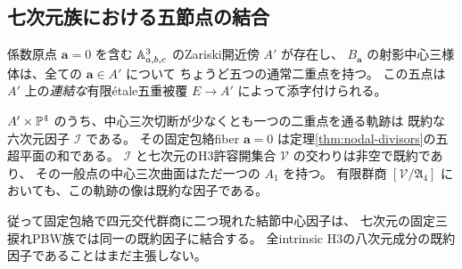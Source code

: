 \subsection{七次元族における五節点の結合}
\begin{theorem}[既約な六次元の結節中心軌跡]
\label{thm:seven-nodal-irreducible}
係数原点 $\mathbf a=0$ を含む $\AA^3_{a,b,c}$ のZariski開近傍 $A'$ が存在し、
$B_{\mathbf a}$ の射影中心三様体は、全ての $\mathbf a\in A'$ について
ちょうど五つの通常二重点を持つ。
この五点は $A'$ 上の\emph{連結な}有限\'{e}tale五重被覆
$E\to A'$ によって添字付けられる。

$A'\times\PP^4$ のうち、中心三次切断が少なくとも一つの二重点を通る軌跡は
既約な六次元因子 $\mathcal I$ である。
その固定包絡fiber $\mathbf a=0$ は定理\ref{thm:nodal-divisors}の五超平面の和である。
$\mathcal I$ と七次元のH3許容開集合 $\mathcal V$ の交わりは非空で既約であり、
その一般点の中心三次曲面はただ一つの $A_1$ を持つ。
有限群商 $[\mathcal V/\mathfrak A_4]$ においても、この軌跡の像は既約な因子である。

従って固定包絡で四元交代群商に二つ現れた結節中心因子は、
七次元の固定三捩れPBW族では同一の既約因子に結合する。
全intrinsic H3の八次元成分の既約因子であることはまだ主張しない。
\end{theorem}
